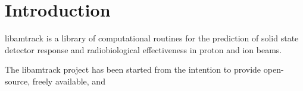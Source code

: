 
\chapter{Introduction}

libamtrack is a library of computational routines for the prediction of solid state detector response and radiobiological effectiveness in proton and ion beams. 

The libamtrack project has been started from the intention to provide open-source, freely available, and 